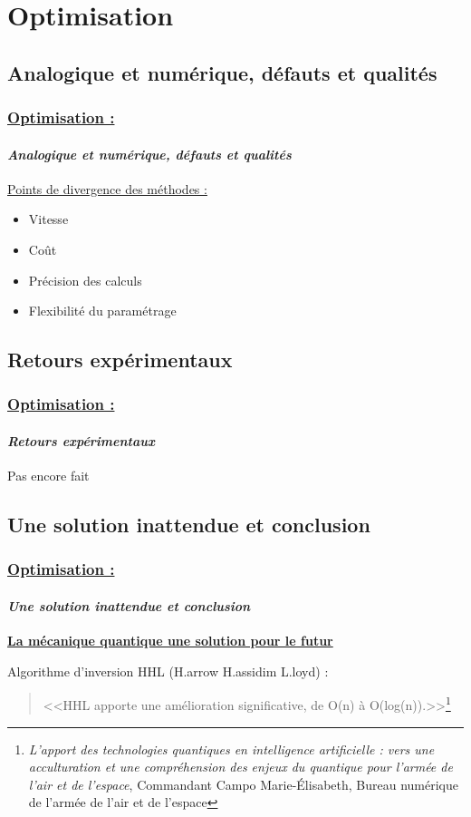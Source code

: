 \documentclass[10pt]{beamer}
\begin{document}
	\section{Optimisation}
	\subsection{Analogique et num\'erique, d\'efauts et qualit\'es}
	\begin{frame}
		\frametitle{\uline{Optimisation :}}
		\framesubtitle{\textit{Analogique et num\'erique, d\'efauts et qualit\'es}}
		\uline{Points de divergence des m\'ethodes :}
		\begin{itemize}
     		\item Vitesse
     		\item Co\^ut
     		\item Pr\'ecision des calculs
     		\item Flexibilit\'e du param\'etrage
 		\end{itemize}
	\end{frame}
	\subsection{Retours exp\'erimentaux}
	\begin{frame}
		\frametitle{\uline{Optimisation :}}
		\framesubtitle{\textit{Retours exp\'erimentaux}}
		Pas encore fait
	\end{frame}
	\subsection{Une solution inattendue et conclusion}
	\begin{frame}
		\frametitle{\uline{Optimisation :}}
		\framesubtitle{\textit{Une solution inattendue et conclusion}}
		\centering
  		\uline{\textbf{La m\'ecanique quantique une solution pour le futur}}
  		\par
  		\vfill
		Algorithme d'inversion HHL (H.arrow H.assidim L.loyd) :
		\begin{quote}
			<<HHL apporte une amélioration significative, de O(n) à O(log(n)).>>\footnote{\textit{L’apport des technologies quantiques en intelligence artificielle : vers une acculturation et une compr\'ehension des enjeux du quantique pour l’arm\'ee de l’air et de l’espace}, Commandant Campo Marie-\'Elisabeth, Bureau num\'erique de l’arm\'ee de l’air et de l’espace}
		\end{quote}
	\end{frame}
	
\end{document}
